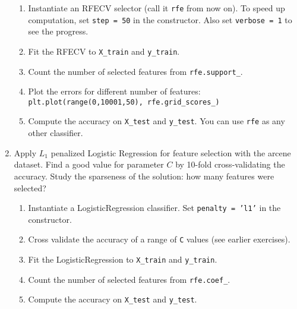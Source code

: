 \documentclass[a4paper,12pt]{scrartcl}
\newcommand{\python}{{\fbox{\texttt{\bfseries python}}\quad}}
\begin{document}
\begin{enumerate}
\begin{enumerate}
	\item Instantiate an RFECV selector (call it \texttt{rfe} from now on). To speed up computation, set \texttt{step = 50} in the constructor.
	Also set \texttt{verbose = 1} to see the progress.
	\item Fit the RFECV to \verb+X_train+ and \verb+y_train+.
	\item Count the number of selected features from \verb+rfe.support_+.
	\item Plot the errors for different number of features:\\
	 \verb+plt.plot(range(0,10001,50), rfe.grid_scores_)+
	\item Compute the accuracy on \verb+X_test+ and \verb+y_test+. You can use \texttt{rfe} as any other classifier.
\end{enumerate}

\item \python Apply $L_1$ penalized Logistic Regression for feature selection with the arcene dataset.
Find a good value for parameter $C$ by 10-fold cross-validating the accuracy.
Study the sparseness of the solution: how many features were selected?

\begin{enumerate}
	\item Instantiate a LogisticRegression classifier. Set \texttt{penalty = 'l1'} in the constructor.
	\item Cross validate the accuracy of a range of \texttt{C} values (see earlier exercises).
	\item Fit the LogisticRegression to \verb+X_train+ and \verb+y_train+.
	\item Count the number of selected features from \verb+rfe.coef_+.
	\item Compute the accuracy on \verb+X_test+ and \verb+y_test+.
\end{enumerate}

\end{enumerate}
\end{document}
